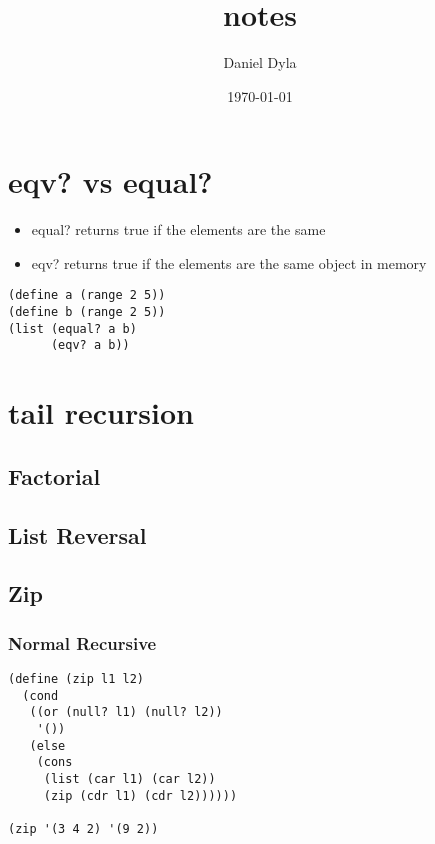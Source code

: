 \documentclass[11pt]{article}
\author{Daniel Dyla}
\date{\today}
\title{notes}
\begin{document}
\maketitle
\tableofcontents

\section{eqv? vs equal?}
\label{sec-1}

\begin{itemize}
\item equal? returns true if the elements are the same
\item eqv? returns true if the elements are the same object in memory
\end{itemize}

\lstset{language=scheme,label= ,caption= ,numbers=none}
\begin{lstlisting}
(define a (range 2 5))
(define b (range 2 5))
(list (equal? a b)
      (eqv? a b))
\end{lstlisting}

\section{tail recursion}
\label{sec-2}

\subsection{Factorial}
\label{sec-2-1}

\subsection{List Reversal}
\label{sec-2-2}

\subsection{Zip}
\label{sec-2-3}

\subsubsection{Normal Recursive}
\label{sec-2-3-1}

\lstset{language=scheme,label= ,caption= ,numbers=none}
\begin{lstlisting}
(define (zip l1 l2)
  (cond
   ((or (null? l1) (null? l2))
    '())
   (else
    (cons
     (list (car l1) (car l2))
     (zip (cdr l1) (cdr l2))))))

(zip '(3 4 2) '(9 2))
\end{lstlisting}
\end{document}
